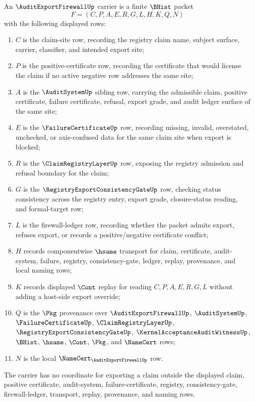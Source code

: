 \begin{definition}
\label{def:audit-export-firewall-carrier}
An $\AuditExportFirewallUp$ carrier is a finite $\BHist$ packet
$$
F=(C,P,A,E,R,G,L,H,K,Q,N)
$$
with the following displayed rows:
\begin{enumerate}
\item $C$ is the claim-site row, recording the registry claim name, subject surface, carrier, classifier, and intended export site;
\item $P$ is the positive-certificate row, recording the certificate that would license the claim if no active negative row addresses the same site;
\item $A$ is the $\AuditSystemUp$ sibling row, carrying the admissible claim, positive certificate, failure certificate, refusal, export grade, and audit ledger surface of the same site;
\item $E$ is the $\FailureCertificateUp$ row, recording missing, invalid, overstated, unchecked, or axis-confused data for the same claim site when export is blocked;
\item $R$ is the $\ClaimRegistryLayerUp$ row, exposing the registry admission and refusal boundary for the claim;
\item $G$ is the $\RegistryExportConsistencyGateUp$ row, checking status consistency across the registry entry, export grade, closure-status reading, and formal-target row;
\item $L$ is the firewall-ledger row, recording whether the packet admits export, refuses export, or records a positive/negative certificate conflict;
\item $H$ records componentwise $\hsame$ transport for claim, certificate, audit-system, failure, registry, consistency-gate, ledger, replay, provenance, and local naming rows;
\item $K$ records displayed $\Cont$ replay for reading $C,P,A,E,R,G,L$ without adding a host-side export override;
\item $Q$ is the $\Pkg$ provenance over $\AuditExportFirewallUp$, $\AuditSystemUp$, $\FailureCertificateUp$, $\ClaimRegistryLayerUp$, $\RegistryExportConsistencyGateUp$, $\KernelAcceptanceAuditWitnessUp$, $\BHist$, $\hsame$, $\Cont$, $\Pkg$, and $\NameCert$ rows;
\item $N$ is the local $\NameCert_{\AuditExportFirewallUp}$ row.
\end{enumerate}
The carrier has no coordinate for exporting a claim outside the displayed claim, positive certificate, audit-system, failure-certificate, registry, consistency-gate, firewall-ledger, transport, replay, provenance, and naming rows.
\end{definition}

